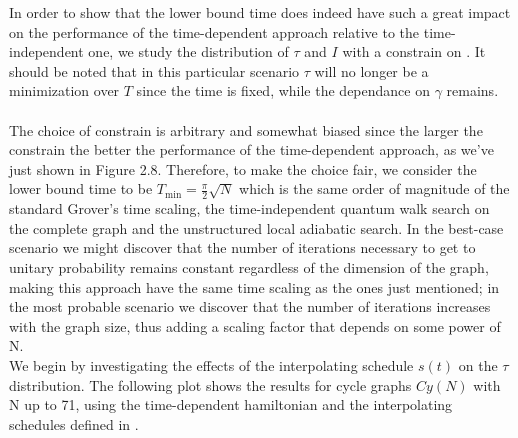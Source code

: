         \vspace{0.5cm}
        In order to show that the lower bound time does indeed have such a great impact on the performance of the time-dependent approach relative to the time-independent one, we study the distribution of $\tau$ and $I$ with a constrain on \tmin. It should be noted that in this particular scenario $\tau$ will no longer be a minimization over $T$ since the time is fixed, while the dependance on $\gamma$ remains. \\ \\ The choice of constrain is arbitrary and somewhat biased since the larger the constrain the better the performance of the time-dependent approach, as we've just shown in Figure 2.8. Therefore, to make the choice fair, we consider the lower bound time to be $T_{\min} = \frac{\pi}{2}\sqrt{N}$ which is the same order of magnitude of the standard Grover's time scaling, the time-independent quantum walk search on the complete graph and the unstructured local adiabatic search. In the best-case scenario we might discover that the number of iterations necessary to get to unitary probability remains constant regardless of the dimension of the graph, making this approach have the same time scaling as the ones just mentioned; in the most probable scenario we discover that the number of iterations increases with the graph size, thus adding a scaling factor that depends on some power of N. \\

        \noindent
        We begin by investigating the effects of the interpolating schedule $s(t)$ on the $\tau$ distribution. The following plot shows the results for cycle graphs $Cy(N)$ with N up to 71, using the time-dependent hamiltonian and the interpolating schedules defined in .\\
        

